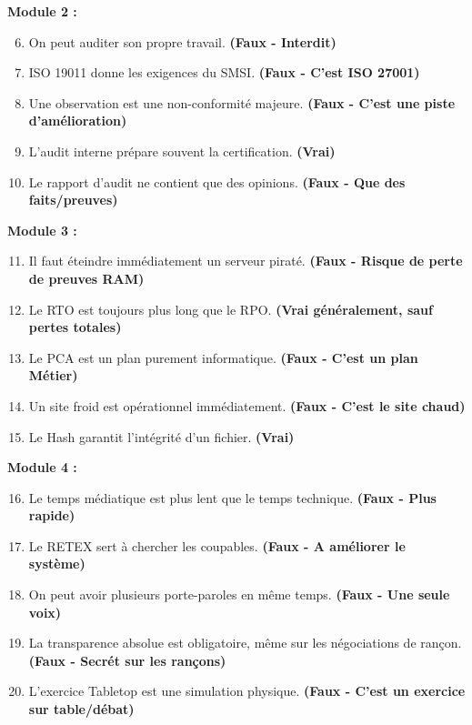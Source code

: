 \textbf{Module 2 :}
\begin{enumerate}
    \setcounter{enumi}{5}
    \item On peut auditer son propre travail. \textbf{(Faux - Interdit)}
    \item ISO 19011 donne les exigences du SMSI. \textbf{(Faux - C'est ISO 27001)}
    \item Une observation est une non-conformité majeure. \textbf{(Faux - C'est une piste d'amélioration)}
    \item L'audit interne prépare souvent la certification. \textbf{(Vrai)}
    \item Le rapport d'audit ne contient que des opinions. \textbf{(Faux - Que des faits/preuves)}
\end{enumerate}

\textbf{Module 3 :}
\begin{enumerate}
    \setcounter{enumi}{10}
    \item Il faut éteindre immédiatement un serveur piraté. \textbf{(Faux - Risque de perte de preuves RAM)}
    \item Le RTO est toujours plus long que le RPO. \textbf{(Vrai généralement, sauf pertes totales)}
    \item Le PCA est un plan purement informatique. \textbf{(Faux - C'est un plan Métier)}
    \item Un site froid est opérationnel immédiatement. \textbf{(Faux - C'est le site chaud)}
    \item Le Hash garantit l'intégrité d'un fichier. \textbf{(Vrai)}
\end{enumerate}

\textbf{Module 4 :}
\begin{enumerate}
    \setcounter{enumi}{15}
    \item Le temps médiatique est plus lent que le temps technique. \textbf{(Faux - Plus rapide)}
    \item Le RETEX sert à chercher les coupables. \textbf{(Faux - A améliorer le système)}
    \item On peut avoir plusieurs porte-paroles en même temps. \textbf{(Faux - Une seule voix)}
    \item La transparence absolue est obligatoire, même sur les négociations de rançon. \textbf{(Faux - Secrét sur les rançons)}
    \item L'exercice Tabletop est une simulation physique. \textbf{(Faux - C'est un exercice sur table/débat)}
\end{enumerate}

